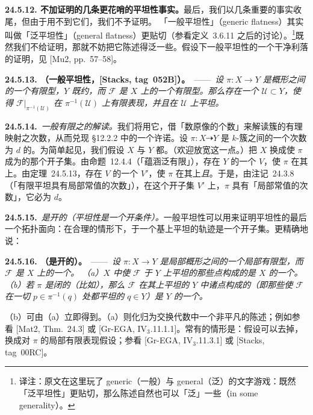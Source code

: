 \textbf{24.5.12. 不加证明的几条更花哨的平坦性事实。}\quad 最后，我们以几条重要的事实收尾，但由于用不到它们，我们不予证明。
「一般平坦性」（generic flatness）其实叫做「泛平坦性」（general flatness）更贴切（参看\mbox{定义~3.6.11} 之后的讨论）。\footnote{译注：原文在这里玩了 generic（一般）与 general（泛）的文字游戏：既然「泛平坦性」更贴切，那么陈述自然也可以「泛」一些（in some generality）。}既然我们不给证明，那就不妨把它陈述得泛一些。\trNoether{}假设下一般平坦性的一个干净利落的证明，见 [Mu2, pp.~57--58]。

\textbf{24.5.13. \trhTheorem{}（一般平坦性，[Stacks, tag~052B]）。}\ ——\ \emph{设 $\pi\colon X\to Y$ 是概形之间的一个有限型\trMorphism，$Y$ 既约，而 $\mathscr{F}$ 是 $X$ 上的一个有限型\trQCSheaf。那么存在一个\trDense\trOpenSubscheme{} $\mathcal{U}\subset Y$，使得 $\mathscr{F}|_{\pi^{-1}(\mathcal{U})}$ 在 $\pi^{-1}(\mathcal{U})$ 上有限表现，并且在 $\mathcal{U}$ 上平坦。}

\textbf{24.5.14.}\ \emph{一般有限\trMorphism{}之\trDegree{}的解读。}\quad 我们将用它，借「数原像的个数」来解读簇的有理映射之次数，从而兑现 \S12.2.2 中的一个许诺。设 $\pi\colon X\dashrightarrow Y$ 是 $k$-簇之间的一个次数为 $d$ 的\trGenericallyFinite{}\trRationalMap。为简单起见，我们假设 $X$ 与 $Y$ 都\trIrreducible。（欢迎放宽这一点。）把 $X$ 换成使 $\pi$ 成为\trMorphism{}的那个开子集。由\mbox{命题~12.4.4}（「\trGenericallyFinite{}蕴涵泛有限」），存在 $Y$ 的一个\trDense\trOpenSubset{} $V$，使 $\pi$ 在其上\trFinite。由\mbox{定理~24.5.13}，存在 $V$ 的一个\trDense\trOpenSubset{} $V'$，使 $\pi$ 在其上\emph{\trFinite{}且\trFlat}。于是，由\mbox{注记~24.3.8}（「有限平坦\trMorphism{}具有局部常值的次数」），在这个开子集 $V'$ 上，$\pi$ 具有「局部常值的次数」，它必为 $d$。

\textbf{24.5.15.}\ \emph{\trFlat\trLocus{}是开的（平坦性是一个开条件）。}\quad 一般平坦性可以用来证明平坦性的最后一个拓扑面向：在合理的情形下，\trQCSheaf{}于一个基上平坦的轨迹是一个开子集。更精确地说：

\textbf{24.5.16. \trhTheorem{}（\trFlat\trLocus{}是开的）。}\ ——\ \emph{设 $\pi\colon X\to Y$ 是局部\trNoether{}概形之间的一个局部有限型\trMorphism，而 $\mathscr{F}$ 是 $X$ 上的一个\trCoherentSheaf。
（a）$X$ 中使 $\mathscr{F}$ 于 $Y$ 上平坦的那些点构成的\trLocus{}是 $X$ 的一个\trOpenSubset。
（b）若 $\pi$ 是闭的（比如\trProper），那么 $\mathscr{F}$ 在其上平坦的 $Y$ 中诸点构成的\trLocus（即那些使 $\mathscr{F}$ 在一切 $p\in\pi^{-1}(q)$ 处都平坦的 $q\in Y$）是 $Y$ 的一个\trOpenSubset。}

（b）可由（a）立即得到。（a）则化归为交换代数中一个非平凡的陈述；例如参看 [Mat2, Thm.~24.3] 或 [Gr-EGA, IV$_3$.11.1.1]。常有的情形是：\trNoether{}假设可以去掉，换成对\trMorphism{} $\pi$ 的局部有限表现假设；参看 [Gr-EGA, IV$_3$.11.3.1] 或 [Stacks, tag~00RC]。
